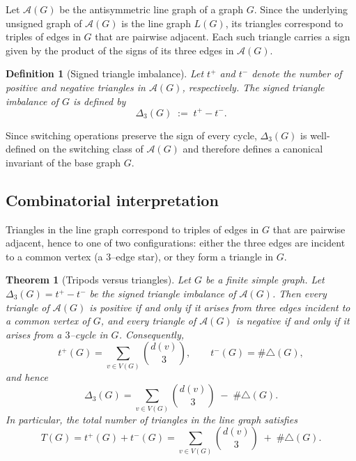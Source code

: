 \documentclass[11pt]{article}
\newtheorem{theorem}{Theorem}
\newtheorem{definition}{Definition}
\theoremstyle{plain}
\begin{document}
Let $\mathcal{A}(G)$ be the antisymmetric line graph of a graph $G$.
Since the underlying unsigned graph of $\mathcal{A}(G)$ is the line graph
$L(G)$, its triangles correspond to triples of edges in $G$ that are pairwise
adjacent.
Each such triangle carries a sign given by the product of the signs of its three
edges in $\mathcal{A}(G)$.

\begin{definition}[Signed triangle imbalance]
Let $t^+$ and $t^-$ denote the number of positive and negative triangles in
$\mathcal{A}(G)$, respectively.
The \emph{signed triangle imbalance} of $G$ is defined by
\[
\Delta_3(G) \;:=\; t^+ - t^- .
\]
\end{definition}

Since switching operations preserve the sign of every cycle, $\Delta_3(G)$ is
well-defined on the switching class of $\mathcal{A}(G)$ and therefore defines a
canonical invariant of the base graph $G$.

\subsection{Combinatorial interpretation}

Triangles in the line graph correspond to triples of edges in $G$ that are
pairwise adjacent, hence to one of two configurations: either the three edges
are incident to a common vertex (a $3$--edge star), or they form a triangle in
$G$.

\begin{theorem}[Tripods versus triangles]\label{thm:delta3-combinatorial}
Let $G$ be a finite simple graph.  Let $\Delta_3(G)=t^+-t^-$ be the signed
triangle imbalance of $\mathcal A(G)$.
Then every triangle of $\mathcal A(G)$ is positive if and only if it arises from
three edges incident to a common vertex of $G$, and every triangle of
$\mathcal A(G)$ is negative if and only if it arises from a $3$--cycle in $G$.
Consequently,
\[
t^+(G)=\sum_{v\in V(G)} \binom{d(v)}{3},\qquad
t^-(G)=\#\triangle(G),
\]
and hence
\begin{equation}\label{eq:delta3-degree-triangle}
\Delta_3(G)=\sum_{v\in V(G)} \binom{d(v)}{3}\;-\;\#\triangle(G).
\end{equation}
In particular, the total number of triangles in the line graph satisfies
\[
T(G)=t^+(G)+t^-(G)=\sum_{v\in V(G)} \binom{d(v)}{3}\;+\;\#\triangle(G).
\]
\end{theorem}
\end{document}
